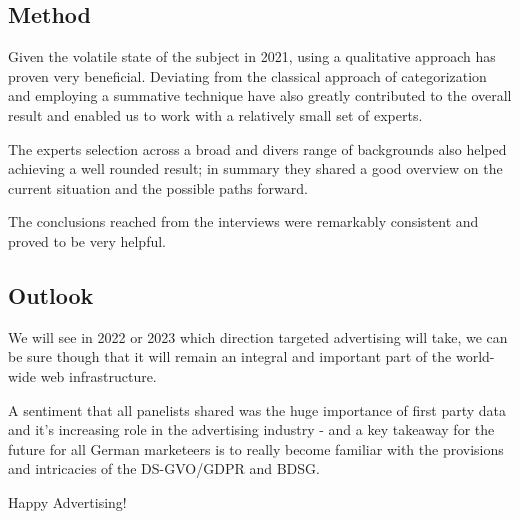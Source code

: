 \subsection{Method}

Given the volatile state of the subject in 2021, using a qualitative approach has proven very beneficial. Deviating from the classical approach of categorization and employing a summative technique have also greatly contributed to the overall result and enabled us to work with a relatively small set of experts.

The experts selection across a broad and divers range of backgrounds also helped achieving a well rounded result; in summary they shared a good overview on the current situation and the possible paths forward.

The conclusions reached from the interviews were remarkably consistent and proved to be very helpful.

\subsection{Outlook}

We will see in 2022 or 2023 which direction targeted advertising will take, we can be sure though that it will remain an integral and important part of the world-wide web infrastructure.

A sentiment that all panelists shared was the huge importance of first party data and it's increasing role in the advertising industry - and a key takeaway for the future for all German marketeers is to really become familiar with the provisions and intricacies of the DS-GVO/GDPR and BDSG.

Happy Advertising!
